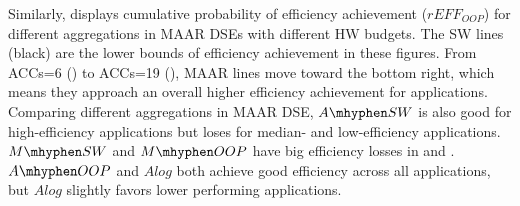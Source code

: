 Similarly,  displays cumulative probability of efficiency achievement ($rEFF_{OOP}$) for different aggregations in MAAR DSEs with different HW budgets. The SW lines (black) are the lower bounds of efficiency achievement in these figures. 
From ACCs=6 () to ACCs=19 (), MAAR lines move toward the bottom right, which means they approach an overall higher efficiency achievement for applications. Comparing different aggregations in MAAR DSE, $A\mhyphen SW$ is also good for high-efficiency applications but loses for median- and low-efficiency applications. 
$M\mhyphen SW$ and $M\mhyphen OOP$ have big efficiency losses in  and . 
$A\mhyphen OOP$ and $Alog$ both achieve good efficiency across all applications, but $Alog$ slightly favors lower performing applications. 
